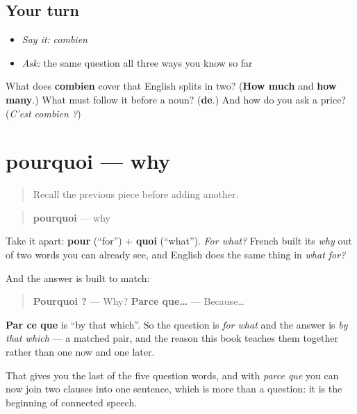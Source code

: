 \subsection*{Your turn}
\begin{itemize}
\raggedright
  \item \emph{Say it:} \emph{combien}
  \item \emph{Ask:} the same question all three ways you know so far
\end{itemize}

\begin{tcolorbox}[breakable,colback=teal!4,colframe=teal!35!black,title={Before you move on}]
What does \textbf{combien} cover that English splits in two? (\textbf{How much} and \textbf{how many}.) What must follow it before a noun? (\textbf{de}.) And how do you ask a price? (\emph{C'est combien ?})
\end{tcolorbox}
\section[pourquoi]{pourquoi — why}

\label{lesson:FR-C32-pourquoi}



\begin{quote}
Recall the previous piece before adding another.
\end{quote}

\begin{cousinweb}
\begin{quote}
\textbf{pourquoi} — why
\end{quote}

Take it apart: \textbf{pour} (\textquotedblleft{}for\textquotedblright{}) + \textbf{quoi} (\textquotedblleft{}what\textquotedblright{}). \emph{For what?} French built its \emph{why} out of two words you can already see, and English does the same thing in \emph{what for?}

And the answer is built to match:

\begin{quote}
\textbf{Pourquoi ?} — Why? \textbf{Parce que…} — Because…
\end{quote}

\textbf{Par ce que} is \textquotedblleft{}by that which\textquotedblright{}. So the question is \emph{for what} and the answer is \emph{by that which} — a matched pair, and the reason this book teaches them together rather than one now and one later.

That gives you the last of the five question words, and with \emph{parce que} you can now join two clauses into one sentence, which is more than a question: it is the beginning of connected speech.
\end{cousinweb}


